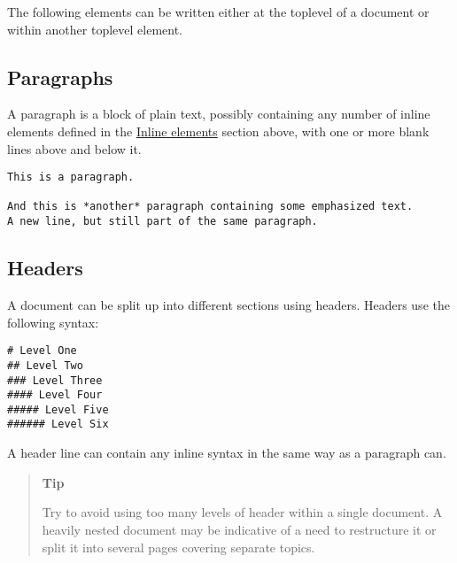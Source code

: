 The following elements can be written either at the {\textquotedbl}toplevel{\textquotedbl} of a document or within another {\textquotedbl}toplevel{\textquotedbl} element.



\hypertarget{7653906193491884111}{}


\subsection{Paragraphs}



A paragraph is a block of plain text, possibly containing any number of inline elements defined in the \href{@ref}{Inline elements} section above, with one or more blank lines above and below it.




\begin{lstlisting}
This is a paragraph.

And this is *another* paragraph containing some emphasized text.
A new line, but still part of the same paragraph.
\end{lstlisting}



\hypertarget{14939650886219602329}{}


\subsection{Headers}



A document can be split up into different sections using headers. Headers use the following syntax:




\begin{verbatim}
# Level One
## Level Two
### Level Three
#### Level Four
##### Level Five
###### Level Six
\end{verbatim}



A header line can contain any inline syntax in the same way as a paragraph can.



\begin{quote}
\textbf{Tip}

Try to avoid using too many levels of header within a single document. A heavily nested document may be indicative of a need to restructure it or split it into several pages covering separate topics.

\end{quote}


